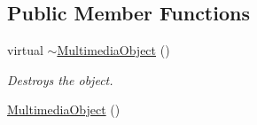 \subsection*{Public Member Functions}
\begin{DoxyCompactItemize}
\item 
\hypertarget{classMultimediaObject_a9f24b38d405a785a73660885ede3b9c5}{}virtual \hyperlink{classMultimediaObject_a9f24b38d405a785a73660885ede3b9c5}{$\sim$\+Multimedia\+Object} ()\label{classMultimediaObject_a9f24b38d405a785a73660885ede3b9c5}

\begin{DoxyCompactList}\small\item\em Destroys the object. \end{DoxyCompactList}\item 
\hypertarget{classMultimediaObject_abba8b5f14970dcd1f035c25dd6cdc0bc}{}\hyperlink{classMultimediaObject_abba8b5f14970dcd1f035c25dd6cdc0bc}{Multimedia\+Object} ()\label{classMultimediaObject_abba8b5f14970dcd1f035c25dd6cdc0bc}


\end{DoxyCompactItemize}
